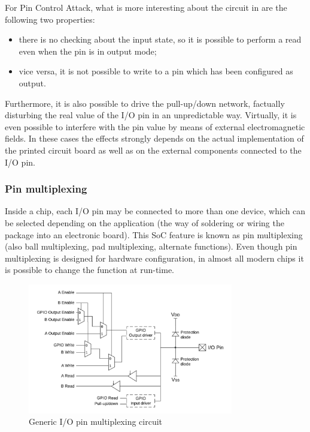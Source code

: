 For Pin Control Attack, what is more interesting about the circuit in  are the following two properties:
\begin{itemize}
	\item there is no checking about the input state, so it is possible to perform a read even when the pin is in output mode;
	\item vice versa, it is not possible to write to a pin which has been configured as output.
\end{itemize}

Furthermore, it is also possible to drive the pull-up/down network, factually disturbing the real value of the I/O pin in an unpredictable way.
Virtually, it is even possible to interfere with the pin value by means of external electromagnetic fields.
In these cases the effects strongly depends on the actual implementation of the printed circuit board as well as on the external components connected to the I/O pin.


\subsubsection{Pin multiplexing}

Inside a chip, each I/O pin may be connected to more than one device, which can be selected depending on the application
(\ie the way of soldering or wiring the package into an electronic board).
This SoC feature is known as pin multiplexing (also ball multiplexing, pad multiplexing, alternate functions).
Even though pin multiplexing is designed for hardware configuration, in almost all modern chips it is possible to change the function at run-time.

\begin{figure}[h]
\centerline{\includegraphics[width=0.8\textwidth]{res/pinmux}}
\caption{Generic I/O pin multiplexing circuit \label{fig:pinmux}}
\end{figure}


